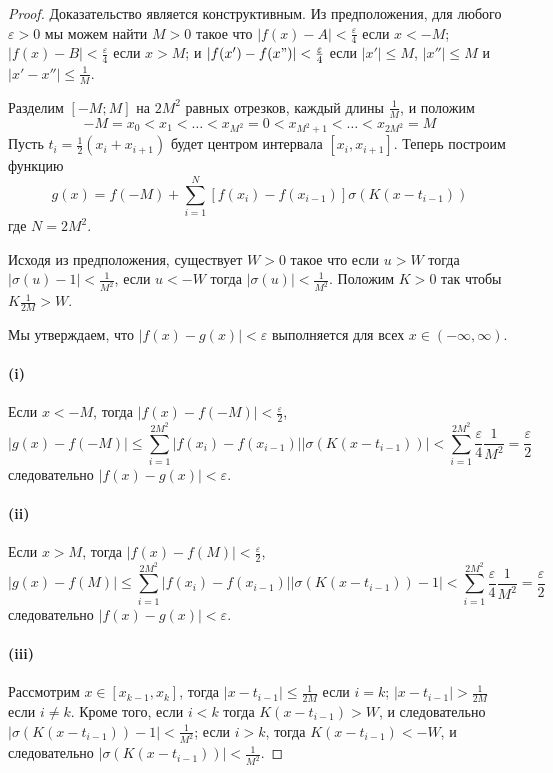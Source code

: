 \documentclass[12pt, twoside]{article}
\theoremstyle{definition}
\begin{document}
\begin{proof}

Доказательство является конструктивным. Из предположения, для любого $\varepsilon>0$ мы можем найти $M>0$ такое что $|f(x)-A|<\frac{\varepsilon}{4}$ если  $x<-M$; $|f(x)-B|<\frac{\varepsilon}{4}$ если $x>M$; и  $|f(x')-f(x")|<\frac{\varepsilon}{4}$ если  $|x'|\leq M$, $|x''|\leq M$ и $|x'-x''|\leq \frac{1}{M}$.

Разделим $[-M;M]$ на $2M^2$ равных отрезков, каждый длины $\frac{1}{M}$, и положим $$-M=x_0<x_1<\dots<x_{M^2}=0<x_{M^2+1}<\dots<x_{2M^2}=M$$
Пусть $t_i=\frac{1}{2}(x_i+x_{i+1})$ будет центром интервала $[x_i,x_{i+1}]$. Теперь построим функцию \begin{equation}\label{eq2}
g(x) = f(-M) + \sum\limits_{i=1}^N[f(x_{i}) - f(x_{i-1})]\sigma(K(x-t_{i-1}))
\end{equation}
где $N=2M^2$.

Исходя из предположения, существует $W>0$ такое что если  $u>W$ тогда $|\sigma(u)-1|<\frac{1}{M^2}$, если $u<-W$ тогда $|\sigma(u)|<\frac{1}{M^2}$. Положим $K>0$ так чтобы $K\frac{1}{2M}>W$.

Мы утверждаем, что $|f(x)-g(x)|<\varepsilon$ выполняется для всех $x\in(-\infty,\infty)$.
\paragraph{(i)} Если $x<-M$, тогда $|f(x)-f(-M)|<\frac{\varepsilon}{2}$,
\begin{equation}\label{eq3}
|g(x)-f(-M)|\leq\sum\limits_{i=1}^{2M^2}|f(x_{i}) - f(x_{i-1})||\sigma(K(x-t_{i-1}))|<\sum\limits_{i=1}^{2M^2}\frac{\varepsilon}{4}\frac{1}{M^2}=\frac{\varepsilon}{2}
\end{equation}
следовательно $|f(x)-g(x)|<\varepsilon$.
\paragraph{(ii)} Если $x>M$, тогда $|f(x)-f(M)|<\frac{\varepsilon}{2}$,
\begin{equation}\label{eq4}
|g(x)-f(M)|\leq\sum\limits_{i=1}^{2M^2}|f(x_{i}) - f(x_{i-1})||\sigma(K(x-t_{i-1}))-1|<\sum\limits_{i=1}^{2M^2}\frac{\varepsilon}{4}\frac{1}{M^2}=\frac{\varepsilon}{2}
\end{equation}
следовательно $|f(x)-g(x)|<\varepsilon$.
\paragraph{(iii)} Рассмотрим $x\in[x_{k-1},x_k]$, тогда $|x-t_{i-1}|\leq\frac{1}{2M}$ если $i=k$; $|x-t_{i-1}|>\frac{1}{2M}$ если $i\neq k$. Кроме того, если $i<k$ тогда $K(x-t_{i-1})>W$, и следовательно $|\sigma(K(x-t_{i-1}))-1|<\frac{1}{M^2}$; если $i>k$, тогда $K(x-t_{i-1})<-W$, и следовательно $|\sigma(K(x-t_{i-1}))|<\frac{1}{M^2}$.


\end{proof}
\end{document}
